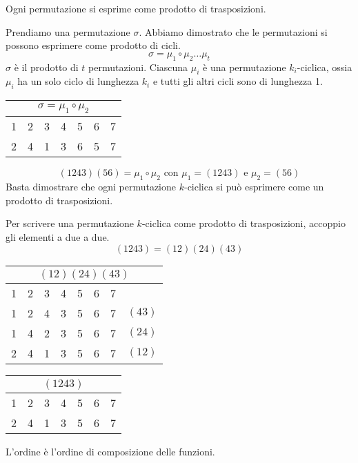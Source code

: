 \begin{prop}
Ogni permutazione si esprime come prodotto di trasposizioni.
\end{prop}
Prendiamo una permutazione $\sigma$. Abbiamo dimostrato che le permutazioni si possono esprimere come prodotto di cicli.
\[
\sigma = \mu_1 \circ \mu_2 \ldots \mu_t
\]
$\sigma$ \`e il prodotto di $t$ permutazioni. Ciascuna $\mu_i$ \`e una permutazione $k_i$-ciclica, ossia $\mu_i$ ha un solo ciclo di lunghezza $k_i$ e tutti gli altri cicli sono di lunghezza 1.
\begin{table}[ht]
\centering
\begin{tabular}{*{7}{c}}
\multicolumn{7}{c}{$\sigma = \mu_1 \circ \mu_2$} \\
\hline
\cellcolor{green!20} 1 & \cellcolor{green!20} 2 & \cellcolor{green!20} 3 & \cellcolor{green!20} 4 & \cellcolor{blue!20} 5 & \cellcolor{blue!20} 6 & 7 \\
\cellcolor{green!20} 2 & \cellcolor{green!20} 4 & \cellcolor{green!20} 1 & \cellcolor{green!20} 3 & \cellcolor{blue!20} 6 & \cellcolor{blue!20} 5 & 7
\end{tabular}
\end{table}
\[
(1 2 4 3) (5 6) = \mu_1 \circ \mu_2 \text{ con } \mu_1 = (1 2 4 3) \text{ e } \mu_2 = (5 6)
\]
Basta dimostrare che ogni permutazione $k$-ciclica si pu\`o esprimere come un prodotto di trasposizioni.

Per scrivere una permutazione $k$-ciclica come prodotto di trasposizioni, accoppio gli elementi a due a due.
\[
(1 2 4 3) = (1 2) (2 4) (4 3)
\]
\begin{table}[ht]
\centering
\begin{tabular}{*{8}{c}}
\multicolumn{8}{c}{$(1 2) (2 4) (4 3)$} \\
\hline
1 & 2 & 3 & 4 & 5 & 6 & 7 & \\
1 & 2 & \cellcolor{green!20} 4 & \cellcolor{green!20} 3 & 5 & 6 & 7 & $(4 3)$ \\
1 & \cellcolor{green!20} 4 & \cellcolor{green!20} 2 & \cellcolor{green!5} 3 & 5 & 6 & 7 & $(2 4)$ \\
\cellcolor{green!20} 2 & \cellcolor{green!5} 4 & \cellcolor{green!20} 1 & \cellcolor{green!5} 3 & 5 & 6 & 7 & $(1 2)$
\end{tabular}
\qquad
\begin{tabular}{*{7}{c}}
\multicolumn{7}{c}{$(1 2 4 3)$} \\
\hline
1 & 2 & 3 & 4 & 5 & 6 & 7 \\
\cellcolor{green!20} 2 & \cellcolor{green!20} 4 & \cellcolor{green!20} 1 & \cellcolor{green!20} 3 & 5 & 6 & 7 
\end{tabular}
\end{table}
L'ordine \`e l'ordine di composizione delle funzioni.

